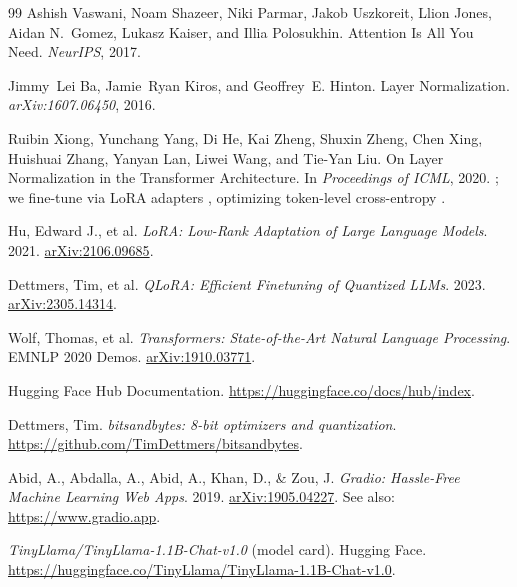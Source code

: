 \documentclass[11pt]{article}
\begin{document}

\begin{thebibliography}{99}
Ashish Vaswani, Noam Shazeer, Niki Parmar, Jakob Uszkoreit, Llion Jones, Aidan N.~Gomez, Lukasz Kaiser, and Illia Polosukhin.
\newblock Attention Is All You Need.
\newblock \emph{NeurIPS}, 2017.

Jimmy~Lei Ba, Jamie~Ryan Kiros, and Geoffrey~E. Hinton.
\newblock Layer Normalization.
\newblock \emph{arXiv:1607.06450}, 2016.

Ruibin Xiong, Yunchang Yang, Di He, Kai Zheng, Shuxin Zheng, Chen Xing, Huishuai Zhang, Yanyan Lan, Liwei Wang, and Tie-Yan Liu.
\newblock On Layer Normalization in the Transformer Architecture.
\newblock In \emph{Proceedings of ICML}, 2020.
\cite{vaswani2017attention}; we fine-tune via LoRA adapters \cite{hu2021lora}, optimizing token-level cross-entropy \cite{bishop2006prml}.

Hu, Edward J., et al. \emph{LoRA: Low-Rank Adaptation of Large Language Models}. 2021. \href{https://arxiv.org/abs/2106.09685}{arXiv:2106.09685}.

Dettmers, Tim, et al. \emph{QLoRA: Efficient Finetuning of Quantized LLMs}. 2023. \href{https://arxiv.org/abs/2305.14314}{arXiv:2305.14314}.

Wolf, Thomas, et al. \emph{Transformers: State-of-the-Art Natural Language Processing}. EMNLP 2020 Demos. \href{https://arxiv.org/abs/1910.03771}{arXiv:1910.03771}.

Hugging Face Hub Documentation. \href{https://huggingface.co/docs/hub/index}{https://huggingface.co/docs/hub/index}.

Dettmers, Tim. \emph{bitsandbytes: 8-bit optimizers and quantization}. \href{https://github.com/TimDettmers/bitsandbytes}{https://github.com/TimDettmers/bitsandbytes}.

Abid, A., Abdalla, A., Abid, A., Khan, D., & Zou, J. \emph{Gradio: Hassle-Free Machine Learning Web Apps}. 2019. \href{https://arxiv.org/abs/1905.04227}{arXiv:1905.04227}. See also: \href{https://www.gradio.app}{https://www.gradio.app}.

\emph{TinyLlama/TinyLlama-1.1B-Chat-v1.0} (model card). Hugging Face. \href{https://huggingface.co/TinyLlama/TinyLlama-1.1B-Chat-v1.0}{https://huggingface.co/TinyLlama/TinyLlama-1.1B-Chat-v1.0}.


\end{thebibliography}
\end{document}
